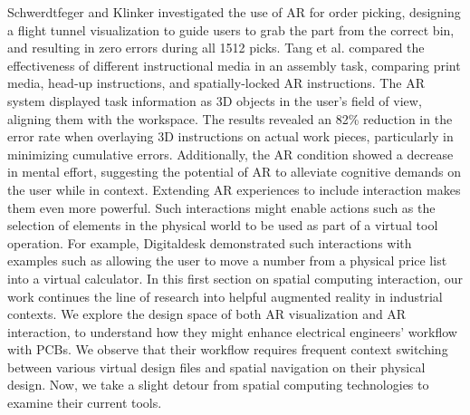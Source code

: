 \documentclass [11pt, proquest] {uwthesis}[2020/02/24]
\begin{document}
Schwerdtfeger and Klinker \cite{Schwerdtfeger2008SupportingReality} investigated the use of AR for order picking, designing a flight tunnel visualization to guide users to grab the part from the correct bin, and resulting in zero errors during all 1512 picks. 
Tang et al. \cite{Tang2003ComparativeAssembly} compared the effectiveness of different instructional media in an assembly task, comparing print media, head-up instructions, and spatially-locked AR instructions. The AR system displayed task information as 3D objects in the user's field of view, aligning them with the workspace. The results revealed an 82\% reduction in the error rate when overlaying 3D instructions on actual work pieces, particularly in minimizing cumulative errors. Additionally, the AR condition showed a decrease in mental effort, suggesting the potential of AR to alleviate cognitive demands on the user while in context.
Extending AR experiences to include interaction makes them even more powerful.
Such interactions might enable actions such as the selection of elements in the physical world to be used as part of a virtual tool operation.
For example, Digitaldesk \cite{Wellner1993InteractingDigitaldesk} demonstrated such interactions with examples such as allowing the user to move a number from a physical price list into a virtual calculator.
In this first section on spatial computing interaction, our work continues the line of research into helpful augmented reality in industrial contexts. We explore the design space of both AR visualization and AR interaction, to understand how they might enhance electrical engineers' workflow with PCBs. We observe that their workflow requires frequent context switching between various virtual design files and spatial navigation on their physical design. Now, we take a slight detour from spatial computing technologies to examine their current tools.


\end{document}

